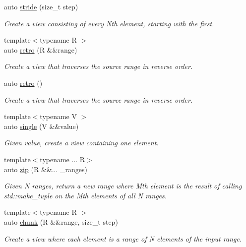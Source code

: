 \begin{DoxyCompactItemize}
auto \mbox{\hyperlink{namespacerah_1_1view_a6b2ab3621be4004c35d77f06165fce78}{stride}} (size\+\_\+t step)
\begin{DoxyCompactList}\small\item\em Create a view consisting of every Nth element, starting with the first. \end{DoxyCompactList}\item 
{\footnotesize template$<$typename R $>$ }\\auto \mbox{\hyperlink{namespacerah_1_1view_ab7e756d22f9204231b4854b9deb51f6f}{retro}} (R \&\&range)
\begin{DoxyCompactList}\small\item\em Create a view that traverses the source range in reverse order. \end{DoxyCompactList}\item 
auto \mbox{\hyperlink{namespacerah_1_1view_a6c6543c61f1fb119394952a72c564753}{retro}} ()
\begin{DoxyCompactList}\small\item\em Create a view that traverses the source range in reverse order. \end{DoxyCompactList}\item 
{\footnotesize template$<$typename V $>$ }\\auto \mbox{\hyperlink{namespacerah_1_1view_ad37c24275c6eb4642a20466545a9baa3}{single}} (V \&\&value)
\begin{DoxyCompactList}\small\item\em Given value, create a view containing one element. \end{DoxyCompactList}\item 
{\footnotesize template$<$typename ... R$>$ }\\auto \mbox{\hyperlink{namespacerah_1_1view_a26c5da9052b94179d6ad8614ea2b9fda}{zip}} (R \&\&... \+\_\+ranges)
\begin{DoxyCompactList}\small\item\em Given N ranges, return a new range where Mth element is the result of calling std\+::make\+\_\+tuple on the Mth elements of all N ranges. \end{DoxyCompactList}\item 
{\footnotesize template$<$typename R $>$ }\\auto \mbox{\hyperlink{namespacerah_1_1view_aa4ea72dd93cb1d17db2f4755bdee0cef}{chunk}} (R \&\&range, size\+\_\+t step)
\begin{DoxyCompactList}\small\item\em Create a view where each element is a range of N elements of the input range. \end{DoxyCompactList}\item 

\end{DoxyCompactItemize}
